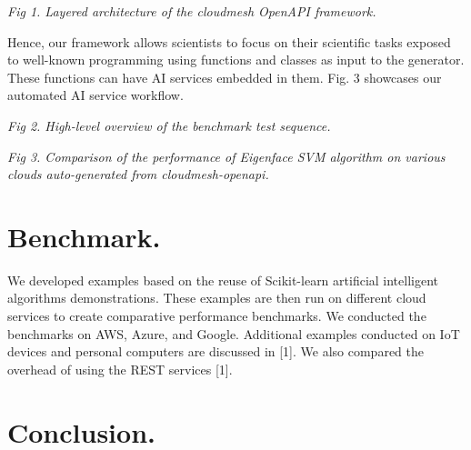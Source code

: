 \documentclass[letter,10pt]{article}
\begin{document}
\begin{multicols}{3}
\begin{center}
\end{center}

{\em Fig 1. Layered architecture of the cloudmesh Open\-API framework.}

\bigskip
Hence, our framework allows scientists to focus on their scientific tasks exposed to well-known programming using functions and classes as input to the generator. These functions can have AI services embedded in them. Fig. 3 showcases our automated AI service workflow. 



\begin{center}
\end{center}

{\em Fig 2. High-level overview of the benchmark test sequence.}


\begin{center}
\end{center}

{\em Fig 3. Comparison of the performance of Eigenface SVM algorithm on various clouds auto-generated from cloudmesh-openapi.}

\section*{Benchmark.}

We developed examples based on the reuse of Scikit-learn artificial intelligent algorithms demonstrations. These examples are then run on different cloud services to create comparative performance benchmarks. We conducted the benchmarks on 
AWS, Azure, and Google. Additional examples conducted on IoT devices and personal computers are discussed in [1]. We also compared the overhead of using the REST services [1].


\section*{Conclusion.}


\end{multicols}
\end{document}
